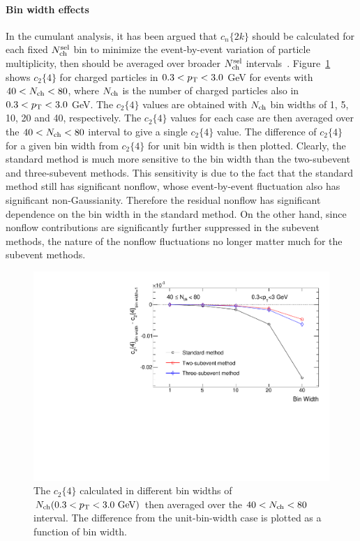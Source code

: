 \paragraph{Bin width effects}

In the cumulant analysis, it has been argued that $c_n\{2k\}$ should be calculated for each fixed $N_\text{ch}^\text{sel}$ bin to minimize the event-by-event variation of particle multiplicity, then should be averaged over broader $N_\text{ch}^\text{sel}$ intervals~\cite{Bilandzic:2010jr, Chatrchyan:2013nka}. Figure~\ref{fig:subcumu_PYTHIA_c24_binWidth} shows $c_2\{4\}$ for charged particles in $0.3<p_\text{T}<3.0$ GeV for events with $40<N_\text{ch}<80$, where $N_\text{ch}$ is the number of charged particles also in $0.3<p_\text{T}<3.0$ GeV. The $c_2\{4\}$ values are obtained with $N_\text{ch}$ bin widths of 1, 5, 10, 20 and 40, respectively. The $c_2\{4\}$ values for each case are then averaged over the $40<N_\text{ch}<80$ interval to give a single $c_2\{4\}$ value. The difference of $c_2\{4\}$ for a given bin width from $c_2\{4\}$ for unit bin width is then plotted. Clearly, the standard method is much more sensitive to the bin width than the two-subevent and three-subevent methods. This sensitivity is due to the fact that the standard method still has significant nonflow, whose event-by-event fluctuation also has significant non-Gaussianity. Therefore the residual nonflow has significant dependence on the bin width in the standard method. On the other hand, since nonflow contributions are significantly further suppressed in the subevent methods, the nature of the nonflow fluctuations no longer matter much for the subevent methods.

\begin{figure}[H]
\centering
\includegraphics[width=.6\linewidth]{figs/chapter_subcumu/PYTHIA_c24_binWidth}
\caption{The $c_2\{4\}$ calculated in different bin widths of $N_\text{ch} (0.3<p_\text{T}<3.0\text{ GeV})$ then averaged over the $40<N_\text{ch}<80$ interval. The difference from the unit-bin-width case is plotted as a function of bin width.}
\label{fig:subcumu_PYTHIA_c24_binWidth}
\end{figure}



